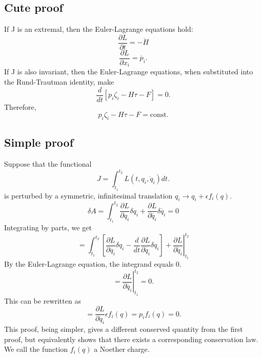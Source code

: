 \documentclass[11pt]{article}
\begin{document}
\subsection{Cute proof}
If J is an extremal, then the Euler-Lagrange equations hold:
$$\frac{\partial L}{\partial t}=-\dot{H}$$
$$\frac{\partial L}{\partial x_i}=\dot{p_i}.$$
If J is also invariant, then the Euler-Lagrange equations, when substituted into the Rund-Trautman identity, make
$$\frac{d}{dt}[p_i\zeta_i-H\tau-F]=0.$$
Therefore,
$$p_i\zeta_i-H\tau-F=\textrm{const.}$$

\subsection{Simple proof}
Suppose that the functional
$$J = \int_{t_1}^{t_2} L(t,q_i,\dot{q}_i)dt.$$
is perturbed by a symmetric, infinitesimal translation $q_i\rightarrow q_i+\epsilon f_i(q).$
$$\delta A = \int_{t_1}^{t_2} \frac{\partial L}{\partial q_i}\delta{q_i}+\frac{\partial L}{\partial \dot{q_i} }\delta{\dot{q_i}}=0$$
Integrating by parts, we get
$$ = \int_{t_1}^{t_2} [\frac{\partial L}{\partial q_i} \delta q_i - \frac{d}{dt} \frac{\partial L}{\partial \dot{q_i}}\delta{q_i}] 
+\left. \frac{\partial L}{\partial \dot{q_i}} \right|_{t_1}^{t_2}  $$
By the Euler-Lagrange equation, the integrand equals 0.
$$=\left. \frac{\partial L}{\partial \dot{q_i}} \right|_{t_1}^{t_2}=0. $$
This can be rewritten as
$$=\frac{\partial L}{\partial q_i}\epsilon f_i(q) = p_i f_i(q)=0.$$
This proof, being simpler, gives a different conserved quantity from the first proof, but equivalently shows that there exists a corresponding conservation law. We call the function $f_i(q)$ a Noether charge. 
\end{document}

